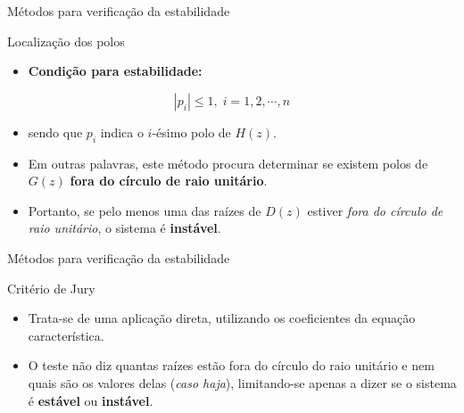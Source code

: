 \begin{frame}{Métodos para verificação da estabilidade}
\begin{block}{Localização dos polos}
\begin{itemize}
    \item \textbf{Condição para estabilidade:}
\end{itemize}
$$\boxed{|p_i| \leq  1, \; i = 1, 2, \cdots, n}$$
\begin{itemize}
    \vspace{-0.3cm}
    \item[] sendo que $p_i$ indica o $i$-ésimo polo de $H(z)$.
    \item Em outras palavras, este método procura determinar se existem polos de $G(z)$ \textbf{fora do círculo de raio unitário}.
    \item Portanto, se pelo menos uma das  raízes de $D(z)$ estiver \textit{fora do círculo de raio unitário}, o sistema é \textbf{instável}.
\end{itemize}
\end{block}
\end{frame}

\begin{frame}{Métodos para verificação da estabilidade}
\begin{block}{Critério de Jury}
\begin{itemize}
    \item Trata-se de uma aplicação direta, utilizando os coeficientes da equação característica.
    \item O teste não diz quantas raízes estão fora do círculo do raio unitário e nem quais são os valores delas (\textit{caso haja}), limitando-se apenas a dizer se o sistema é \textbf{estável} ou \textbf{instável}.
\end{itemize}
\end{block}
\end{frame}

